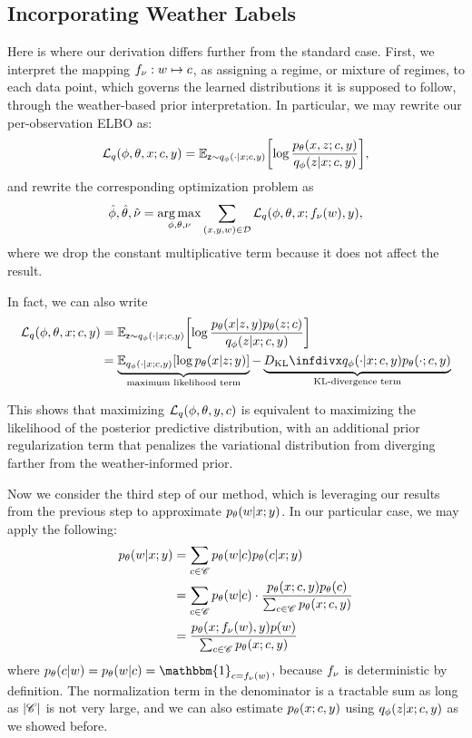 \subsection{Incorporating Weather Labels}

Here is where our derivation differs further from the standard case. First, we interpret the mapping $f_{\nu} :w\mapsto c$, as assigning a regime, or mixture of regimes, to each data point, which governs the learned distributions it is supposed to follow, through the weather-based prior interpretation. In particular, we may rewrite our per-observation ELBO as:
\begin{equation}
    \elbo{q}{\phi, \theta, x; c, y} = \EX{\rz \sim \qvd{\cdot\given x;c,y} }{ \log\frac{\pld{x,z;c,y} }{\qvd{z\given x; c,y}}},
\end{equation}
and rewrite the corresponding optimization problem as 
\begin{equation}
    \hat\phi,\hat\theta,\hat\nu = \argmax_{\phi,\theta,\nu} \sum_{(x,y,w)\in \Data} \elbo{q}{\phi,\theta,x;\fvd{w},y},
\end{equation}
where we drop the constant multiplicative term because it does not affect the result. 

\begin{proposition}
    In fact, we can also write
    \begin{align*}
        \elbo{q}{\phi, \theta, x; c,y} &= \EX{\rz \sim \qvd{\cdot\given x;c,y} }{ \log\frac{\pld{x\given z,y}\pld{z;c} }{\qvd{z\given x; c,y}}} \\
        &= \underbrace{\EX{\qvd{\cdot\given x;c,y} }{ \log\pld{x\given z;y} }}_{\text{maximum likelihood term}} - \underbrace{\DKL{\qvd{\cdot\given x;c,y}}{\pld{\cdot;c,y}}}_{\text{KL-divergence term}}
    \end{align*}
\end{proposition}

This shows that maximizing $\elbo{q}{\phi,\theta,y,c}$ is equivalent to maximizing the likelihood of the posterior predictive distribution, with an additional prior regularization term that penalizes the variational distribution from diverging farther from the weather-informed prior. 

Now we consider the third step of our method, which is leveraging our results from the previous step to approximate $\pld{w\given x;y}$. In our particular case, we may apply the following:
\begin{align}
    \pld{w\given x;y} &= \sum_{c\in\ms C} \pld{w\given c}\pld{c\given x;y}\\
    &= \sum_{c\in\ms C} \pld{w\given c}\cdot\frac{\pld{x;c,y}\pld{c}}{\sum_{c\in\ms C} \pld{x;c,y}} \\
    &= \frac{\pld{x;\fvd{w},y}\pd{w}}{\sum_{c\in\ms C} \pld{x;c,y}}
\end{align}
where $\pld{c\given w}=\pld{w\given c}=\mathbbm{1}_{c=\fvd{w}}$, because $f_{\nu}$ is deterministic by definition. The normalization term in the denominator is a tractable sum as long as $|\mathscr{C}|$ is not very large, and we can also estimate $\pld{x;c,y}$ using $\qvd{z\given x;c,y}$ as we showed before.


